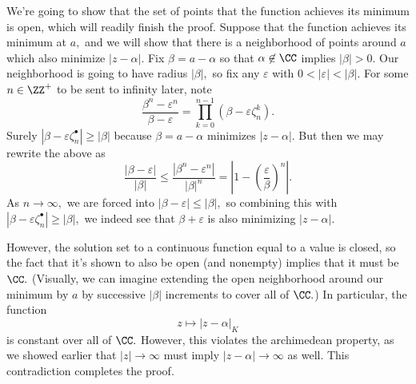 We're going to show that the set of points that the function achieves its minimum is open, which will readily finish the proof. Suppose that the function achieves its minimum at $a,$ and we will show that there is a neighborhood of points around $a$ which also minimize $|z-\alpha|.$ Fix $\beta=a-\alpha$ so that $\alpha\not\in\CC$ implies $|\beta|>0.$ Our neighborhood is going to have radius $|\beta|,$ so fix any $\varepsilon$ with $0<|\varepsilon|<|\beta|.$ For some $n\in\ZZ^+$ to be sent to infinity later, note
\[\frac{\beta^n-\varepsilon^n}{\beta-\varepsilon}=\prod_{k=0}^{n-1}\left(\beta-\varepsilon\zeta_n^k\right).\]
Surely $|\beta-\varepsilon\zeta_n^\bullet|\ge|\beta|$ because $\beta=a-\alpha$ minimizes $|z-\alpha|.$ But then we may rewrite the above as
\[\frac{|\beta-\varepsilon|}{|\beta|}\le\frac{\left|\beta^n-\varepsilon^n\right|}{|\beta|^n}=\left|1-\left(\frac\varepsilon\beta\right)^n\right|.\]
As $n\to\infty,$ we are forced into $|\beta-\varepsilon|\le|\beta|,$ so combining this with $|\beta-\varepsilon\zeta_n^\bullet|\ge|\beta|,$ we indeed see that $\beta+\varepsilon$ is also minimizing $|z-\alpha|.$

However, the solution set to a continuous function equal to a value is closed, so the fact that it's shown to also be open (and nonempty) implies that it must be $\CC.$ (Visually, we can imagine extending the open neighborhood around our minimum by $a$ by successive $|\beta|$ increments to cover all of $\CC.$) In particular, the function
\[z\mapsto|z-\alpha|_K\]
is constant over all of $\CC.$ However, this violates the archimedean property, as we showed earlier that $|z|\to\infty$ must imply $|z-\alpha|\to\infty$ as well. This contradiction completes the proof.

